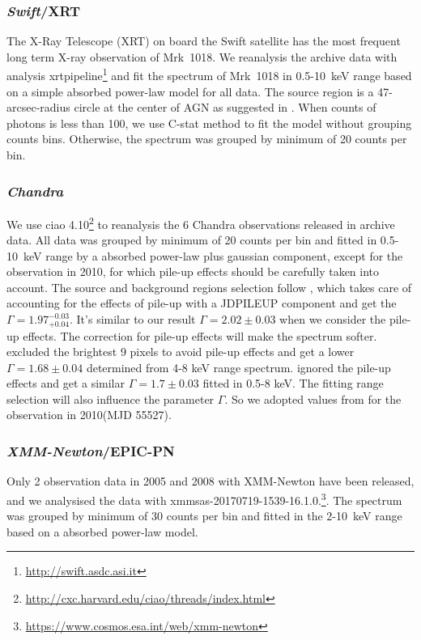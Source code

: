 \documentclass{aastex63}
\newcommand{\xmm}{{\em XMM-Newton}}
\newcommand{\chandra}{{\em Chandra}}
\newcommand{\swift}{{\em Swift}}
\begin{document}

\subsubsection{\swift/XRT}
The X-Ray Telescope (XRT) on board the Swift satellite has the most frequent long term X-ray observation of Mrk~1018. We reanalysis the archive data with analysis xrtpipeline\footnote{\url{http://swift.asdc.asi.it}} and fit the spectrum of Mrk~1018 in 0.5-10~keV range based on a simple absorbed power-law model for all data.  The source region is a 47-arcsec-radius circle at the center of AGN as suggested in \citet{2009MNRAS.397.1177E}. When counts of photons is less than 100, we use C-stat method to fit the model without grouping counts bins. Otherwise, the spectrum was grouped by minimum of 20 counts per bin. 


\subsubsection{\chandra}
We use ciao 4.10\footnote{\url{http://cxc.harvard.edu/ciao/threads/index.html}} to reanalysis the 6 Chandra observations released in archive data. All data was grouped by minimum of 20 counts per bin and fitted in 0.5-10~keV range by a absorbed power-law plus gaussian component, except for the observation in 2010, for which pile-up effects should be carefully taken into account. The source and background regions selection follow \citet{2017ApJ...840...11L}, which takes care of accounting for the effects of pile-up with a JDPILEUP component and get the  $\Gamma =1.97_{+0.04}^{-0.03}$. It's similar to our result $\Gamma =2.02\pm{0.03}$ when we consider the pile-up effects. The correction for pile-up effects will make the spectrum softer. \citet{2016A&A...593L...9H} excluded the brightest 9 pixels to avoid pile-up effects and get a lower $\Gamma =1.68\pm0.04$ determined from 4-8 keV range spectrum. \citet{2017A&A...607L...9K} ignored the pile-up effects and get a similar $\Gamma =1.7\pm0.03$ fitted in 0.5-8 keV. The fitting range selection will also influence the parameter $\Gamma$. So we adopted values from \citet{2017A&A...607L...9K} for the observation in 2010(MJD 55527).

\subsubsection{\xmm/EPIC-PN}
Only 2 observation data in 2005 and 2008 with XMM-Newton have been released, and we analysised the data with xmmsas-20170719-1539-16.1.0.\footnote{\url{https://www.cosmos.esa.int/web/xmm-newton}}. The spectrum was grouped by minimum of 30 counts per bin and fitted in the 2-10~keV range based on a absorbed power-law model. 
\end{document}
